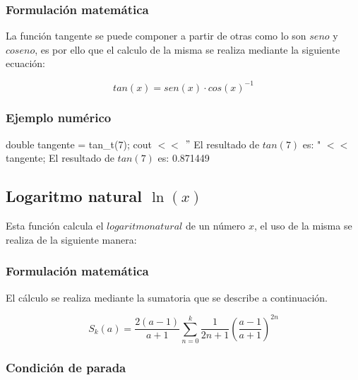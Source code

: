 \documentclass[10pt,a4paper]{article}
\begin{document}
	\subsubsection{Formulación matemática}
	
	La función tangente se puede componer a partir de otras como lo son $seno$ y $coseno$, es por ello que el calculo de la misma se realiza mediante la siguiente ecuación:
	
	\begin{equation}\label{key10}
		tan(x) = sen(x)\cdot cos(x)^{-1}
	\end{equation}
	
	\subsubsection{Ejemplo numérico}

	double tangente = tan{\_}t(7); \newline
	cout $<<$ $"$ El resultado de $tan(7)$ es: " $<<$ tangente; \newline
	El resultado de $tan(7)$ es: 0.871449\newline
	
	\subsection{Logaritmo natural $\ln(x)$}
	
	Esta función calcula el $logaritmo natural$ de un número $x$, el uso de la misma se realiza de la siguiente manera:
	
	\begin{center}
	\end{center}
	
	\subsubsection{Formulación matemática}
	
	El cálculo se realiza mediante la sumatoria que se describe a continuación.
	
	\begin{equation}\label{key11}
		S_{k}(a) = \frac{2(a-1)}{a + 1}\sum_{n=0}^{k}\frac{1}{2n + 1}\left(\frac{a - 1}{a + 1}\right)^{2n}
	\end{equation}
	
	\subsubsection{Condición de parada}
	
\end{document}
